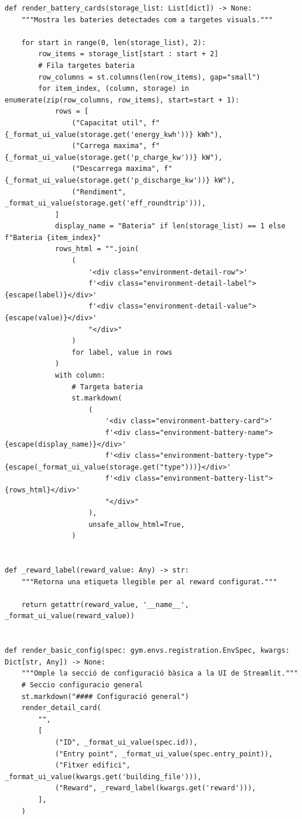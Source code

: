 \documentclass[10pt,a4paper]{article}
\begin{document}
\begin{lstlisting}[style=studioPython,caption={pages/Mostrar\_Entorn.py},label={lst:pages-mostrar-entorn-py}]
def render_battery_cards(storage_list: List[dict]) -> None:
    """Mostra les bateries detectades com a targetes visuals."""

    for start in range(0, len(storage_list), 2):
        row_items = storage_list[start : start + 2]
        # Fila targetes bateria
        row_columns = st.columns(len(row_items), gap="small")
        for item_index, (column, storage) in enumerate(zip(row_columns, row_items), start=start + 1):
            rows = [
                ("Capacitat util", f"{_format_ui_value(storage.get('energy_kwh'))} kWh"),
                ("Carrega maxima", f"{_format_ui_value(storage.get('p_charge_kw'))} kW"),
                ("Descarrega maxima", f"{_format_ui_value(storage.get('p_discharge_kw'))} kW"),
                ("Rendiment", _format_ui_value(storage.get('eff_roundtrip'))),
            ]
            display_name = "Bateria" if len(storage_list) == 1 else f"Bateria {item_index}"
            rows_html = "".join(
                (
                    '<div class="environment-detail-row">'
                    f'<div class="environment-detail-label">{escape(label)}</div>'
                    f'<div class="environment-detail-value">{escape(value)}</div>'
                    "</div>"
                )
                for label, value in rows
            )
            with column:
                # Targeta bateria
                st.markdown(
                    (
                        '<div class="environment-battery-card">'
                        f'<div class="environment-battery-name">{escape(display_name)}</div>'
                        f'<div class="environment-battery-type">{escape(_format_ui_value(storage.get("type")))}</div>'
                        f'<div class="environment-battery-list">{rows_html}</div>'
                        "</div>"
                    ),
                    unsafe_allow_html=True,
                )


def _reward_label(reward_value: Any) -> str:
    """Retorna una etiqueta llegible per al reward configurat."""

    return getattr(reward_value, '__name__', _format_ui_value(reward_value))


def render_basic_config(spec: gym.envs.registration.EnvSpec, kwargs: Dict[str, Any]) -> None:
    """Omple la secció de configuració bàsica a la UI de Streamlit."""
    # Seccio configuracio general
    st.markdown("#### Configuració general")
    render_detail_card(
        "",
        [
            ("ID", _format_ui_value(spec.id)),
            ("Entry point", _format_ui_value(spec.entry_point)),
            ("Fitxer edifici", _format_ui_value(kwargs.get('building_file'))),
            ("Reward", _reward_label(kwargs.get('reward'))),
        ],
    )



\end{lstlisting}
\end{document}
